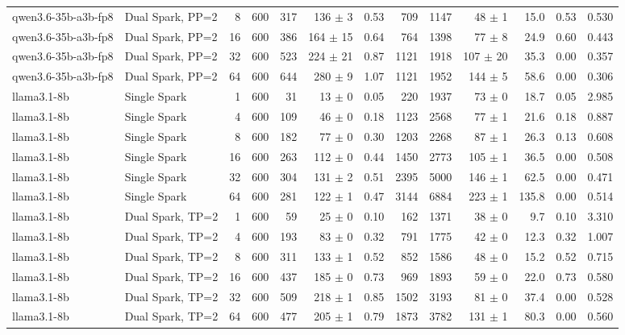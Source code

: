 \begin{tabular}{l l r r r r r r r r r r r}
qwen3.6-35b-a3b-fp8 & Dual Spark, PP=2 & 8 & 600 & 317 & 136 $\pm$ 3 & 0.53 & 709 & 1147 & 48 $\pm$ 1 & 15.0 & 0.53 & 0.530 \\
qwen3.6-35b-a3b-fp8 & Dual Spark, PP=2 & 16 & 600 & 386 & 164 $\pm$ 15 & 0.64 & 764 & 1398 & 77 $\pm$ 8 & 24.9 & 0.60 & 0.443 \\
qwen3.6-35b-a3b-fp8 & Dual Spark, PP=2 & 32 & 600 & 523 & 224 $\pm$ 21 & 0.87 & 1121 & 1918 & 107 $\pm$ 20 & 35.3 & 0.00 & 0.357 \\
qwen3.6-35b-a3b-fp8 & Dual Spark, PP=2 & 64 & 600 & 644 & 280 $\pm$ 9 & 1.07 & 1121 & 1952 & 144 $\pm$ 5 & 58.6 & 0.00 & 0.306 \\
\addlinespace
llama3.1-8b & Single Spark & 1 & 600 & 31\rlap{$^\dagger$} & 13 $\pm$ 0 & 0.05 & 220 & 1937 & 73 $\pm$ 0 & 18.7 & 0.05 & 2.985 \\
llama3.1-8b & Single Spark & 4 & 600 & 109 & 46 $\pm$ 0 & 0.18 & 1123 & 2568 & 77 $\pm$ 1 & 21.6 & 0.18 & 0.887 \\
llama3.1-8b & Single Spark & 8 & 600 & 182 & 77 $\pm$ 0 & 0.30 & 1203 & 2268 & 87 $\pm$ 1 & 26.3 & 0.13 & 0.608 \\
llama3.1-8b & Single Spark & 16 & 600 & 263 & 112 $\pm$ 0 & 0.44 & 1450 & 2773 & 105 $\pm$ 1 & 36.5 & 0.00 & 0.508 \\
llama3.1-8b & Single Spark & 32 & 600 & 304 & 131 $\pm$ 2 & 0.51 & 2395 & 5000 & 146 $\pm$ 1 & 62.5 & 0.00 & 0.471 \\
llama3.1-8b & Single Spark & 64 & 600 & 281 & 122 $\pm$ 1 & 0.47 & 3144 & 6884 & 223 $\pm$ 1 & 135.8 & 0.00 & 0.514 \\
\addlinespace
llama3.1-8b & Dual Spark, TP=2 & 1 & 600 & 59\rlap{$^\dagger$} & 25 $\pm$ 0 & 0.10 & 162 & 1371 & 38 $\pm$ 0 & 9.7 & 0.10 & 3.310 \\
llama3.1-8b & Dual Spark, TP=2 & 4 & 600 & 193 & 83 $\pm$ 0 & 0.32 & 791 & 1775 & 42 $\pm$ 0 & 12.3 & 0.32 & 1.007 \\
llama3.1-8b & Dual Spark, TP=2 & 8 & 600 & 311 & 133 $\pm$ 1 & 0.52 & 852 & 1586 & 48 $\pm$ 0 & 15.2 & 0.52 & 0.715 \\
llama3.1-8b & Dual Spark, TP=2 & 16 & 600 & 437 & 185 $\pm$ 0 & 0.73 & 969 & 1893 & 59 $\pm$ 0 & 22.0 & 0.73 & 0.580 \\
llama3.1-8b & Dual Spark, TP=2 & 32 & 600 & 509 & 218 $\pm$ 1 & 0.85 & 1502 & 3193 & 81 $\pm$ 0 & 37.4 & 0.00 & 0.528 \\
llama3.1-8b & Dual Spark, TP=2 & 64 & 600 & 477 & 205 $\pm$ 1 & 0.79 & 1873 & 3782 & 131 $\pm$ 1 & 80.3 & 0.00 & 0.560 \\

\end{tabular}
